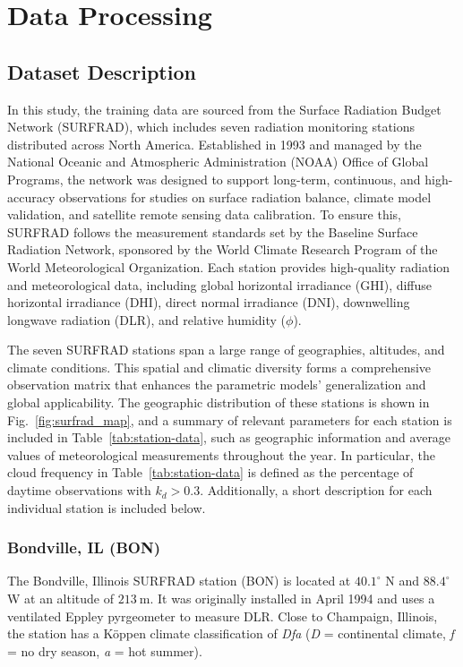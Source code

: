 \documentclass[preprint,12pt]{elsarticle}
\begin{document}
\section{Data Processing}

\subsection{Dataset Description}

In this study, the training data are sourced from the Surface Radiation Budget Network (SURFRAD), which includes seven radiation monitoring stations distributed across North America. Established in 1993 and managed by the National Oceanic and Atmospheric Administration (NOAA) Office of Global Programs, the network was designed to support long-term, continuous, and high-accuracy observations for studies on surface radiation balance, climate model validation, and satellite remote sensing data calibration. To ensure this, SURFRAD follows the measurement standards set by the Baseline Surface Radiation Network, sponsored by the World Climate Research Program of the World Meteorological Organization. Each station provides high-quality radiation and meteorological data, including global horizontal irradiance (GHI), diffuse horizontal irradiance (DHI), direct normal irradiance (DNI), downwelling longwave radiation (DLR), and relative humidity ($\phi$). %

The seven SURFRAD stations span a large range of geographies, altitudes, and climate conditions. This spatial and climatic diversity forms a comprehensive observation matrix that enhances the parametric models' generalization and global applicability. The geographic distribution of these stations is shown in Fig.~\ref{fig:surfrad_map}, and a summary of relevant parameters for each station is included in Table~\ref{tab:station-data}, such as geographic information and average values of meteorological measurements throughout the year. In particular, the cloud frequency in Table~\ref{tab:station-data} is defined as the percentage of daytime observations with $k_d > 0.3$. Additionally, a short description for each individual station is included below. 

\subsubsection{Bondville, IL (BON)}
The Bondville, Illinois SURFRAD station (BON) is located at $40.1^{\circ}$ N and $88.4^{\circ}$ W at an altitude of $\SI{213}{\meter}$. It was originally installed in April 1994 and uses a ventilated Eppley pyrgeometer to measure DLR. Close to Champaign, Illinois, the station has a Köppen climate classification of \textit{Dfa} (\textit{D} = continental climate, \textit{f} = no dry season, \textit{a} = hot summer). 
\end{document}
